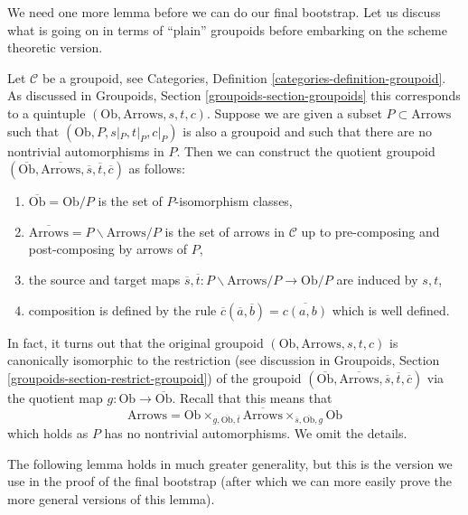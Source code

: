 \noindent
We need one more lemma before we can do our final bootstrap.
Let us discuss what is going on in terms of ``plain'' groupoids before
embarking on the scheme theoretic version.

\medskip\noindent
Let $\mathcal{C}$ be a groupoid, see
Categories, Definition \ref{categories-definition-groupoid}.
As discussed in
Groupoids, Section \ref{groupoids-section-groupoids}
this corresponds to a quintuple $(\text{Ob}, \text{Arrows}, s, t, c)$.
Suppose we are given a subset $P \subset \text{Arrows}$ such that
$(\text{Ob}, P, s|_P, t|_P, c|_P)$ is also a groupoid and such
that there are no nontrivial automorphisms in $P$. Then we can construct
the quotient groupoid
$(\overline{\text{Ob}}, \overline{\text{Arrows}}, \overline{s},
\overline{t}, \overline{c})$
as follows:
\begin{enumerate}
\item $\overline{\text{Ob}} = \text{Ob}/P$
is the set of $P$-isomorphism classes,
\item $\overline{\text{Arrows}} = P\backslash \text{Arrows}/P$
is the set of arrows in $\mathcal{C}$ up to pre-composing and
post-composing by arrows of $P$,
\item the source and target maps
$\overline{s}, \overline{t} : P\backslash \text{Arrows}/P \to \text{Ob}/P$
are induced by $s, t$,
\item composition is defined by the rule
$\overline{c}(\overline{a}, \overline{b}) = \overline{c(a, b)}$
which is well defined.
\end{enumerate}
In fact, it turns out that the original groupoid
$(\text{Ob}, \text{Arrows}, s, t, c)$ is canonically
isomorphic to the restriction (see discussion in
Groupoids, Section \ref{groupoids-section-restrict-groupoid})
of the groupoid
$(\overline{\text{Ob}}, \overline{\text{Arrows}}, \overline{s},
\overline{t}, \overline{c})$ via the quotient map
$g : \text{Ob} \to \overline{\text{Ob}}$. Recall that this means
that
$$
\text{Arrows} = 
\text{Ob}
\times_{g, \overline{\text{Ob}}, \overline{t}}
\overline{\text{Arrows}}
\times_{\overline{s}, \overline{\text{Ob}}, g}
\text{Ob}
$$
which holds as $P$ has no nontrivial automorphisms.
We omit the details.

\medskip\noindent
The following lemma holds in much greater generality, but this is
the version we use in the proof of the final bootstrap (after which
we can more easily prove the more general versions of this lemma).

